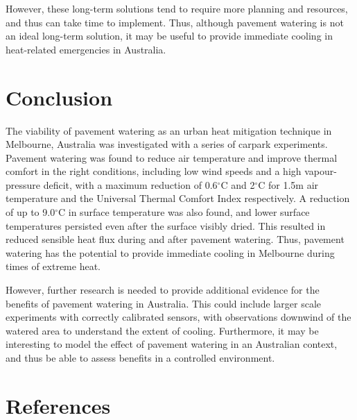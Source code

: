 \documentclass[final,3p,times,authoryear]{elsarticle}
\begin{document}
However, these long-term solutions tend to require more planning and resources, and thus can take time to implement. Thus, although pavement watering is not an ideal long-term solution, it may be useful to provide immediate cooling in heat-related emergencies in Australia.

\section{Conclusion}\label{sec:conclusion}

The viability of pavement watering as an urban heat mitigation technique in Melbourne, Australia was investigated with a series of carpark experiments. Pavement watering was found to reduce air temperature and improve thermal comfort in the right conditions, including low wind speeds and a high vapour-pressure deficit, with a maximum reduction of 0.6$^{\circ}$C and 2$^{\circ}$C for 1.5m air temperature and the Universal Thermal Comfort Index respectively. A reduction of up to 9.0$^{\circ}$C in surface temperature was also found, and lower surface temperatures persisted even after the surface visibly dried. This resulted in reduced sensible heat flux during and after pavement watering. Thus, pavement watering has the potential to provide immediate cooling in Melbourne during times of extreme heat.

However, further research is needed to provide additional evidence for the benefits of pavement watering in Australia. This could include larger scale experiments with correctly calibrated sensors, with observations downwind of the watered area to understand the extent of cooling. Furthermore, it may be interesting to model the effect of pavement watering in an Australian context, and thus be able to assess benefits in a controlled environment.



\printglossaries

\section{References}\label{sec:ref}
 

\end{document}

